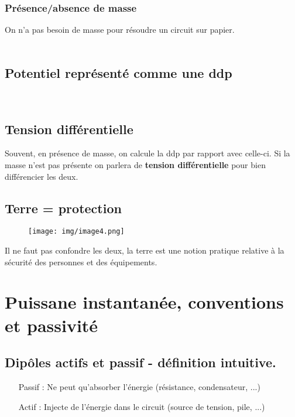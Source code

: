 \documentclass[british,french,11pt, a4paper, openany]{book}
\begin{document}
		\subsubsection{Présence/absence de masse}
		On n'a pas besoin de masse pour résoudre un circuit sur papier.\\
		\ \\
		
		\subsection{Potentiel représenté comme une ddp}
		\ \\
		
		\subsection{Tension différentielle}
		Souvent, en présence de masse, on calcule la ddp par rapport avec celle-ci. Si la masse n'est pas présente on parlera de \textbf{tension différentielle} pour bien différencier les deux.
		
		\subsection{Terre = protection}
		\begin{wrapfigure}[5]{r}{2.5cm}
			\texttt{[image: img/image4.png]}
		\end{wrapfigure}
		Il ne faut pas confondre les deux, la terre est une notion pratique relative à la sécurité des personnes et des équipements.
		
		\section{Puissane instantanée, conventions et passivité}
		\subsection{Dipôles actifs et passif - définition intuitive.}
		\begin{itemize}
			\item[Passif] : Ne peut qu'absorber l'énergie (résistance, condensateur, ...)
			\item[Actif] : Injecte de l'énergie dans le circuit (source de tension, pile, ...)
		\end{itemize}
		
\end{document}
